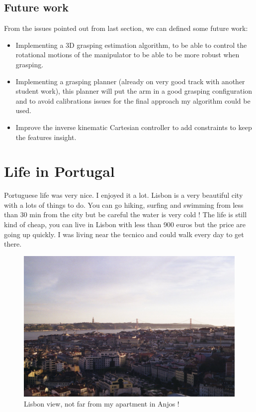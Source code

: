 \subsection{Future work}
From the issues pointed out from last section, we can defined some future work:
\begin{itemize}
    \item Implementing a 3D grasping estimation algorithm, to be able to control the rotational motions of the manipulator to be able to be more robust when grasping.
    \item Implementing a grasping planner (already on very good track with another student work), this planner will put the arm in a good  grasping configuration and to avoid calibrations issues for the final approach my algorithm could be used.
    \item Improve the inverse kinematic Cartesian controller to add constraints to keep the features insight. 
\end{itemize}

\section{Life in Portugal}

Portuguese life was very nice. I enjoyed it a lot. Lisbon is a very beautiful city with a lots of things to do. You can go hiking, surfing and swimming from less than 30 min from the city but be careful the water is very cold ! The life is still kind of cheap, you can live in Lisbon with less than 900 euros but the price are going up quickly. I was living near the tecnico and could walk every day to get there. \\[2cm]

\begin{figure} [!ht]
    \centering
    \includegraphics[width=1\linewidth]{images/12.jpg}
    \caption{Lisbon view, not far from my apartment in Anjos !}
    \label{pict:open_loop}
\end{figure}